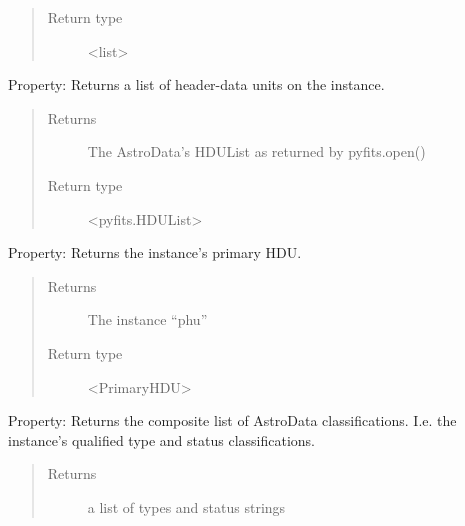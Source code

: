 \documentclass[letterpaper,10pt,english]{sphinxmanual}
\begin{document}
\begin{fulllineitems}
\begin{fulllineitems}
\begin{quote}
\begin{description}
\item[{Return type}] \leavevmode
\textless{}list\textgreater{}

\end{description}\end{quote}

\end{fulllineitems}


\begin{fulllineitems}
\label{astro_class:astrodata.AstroData.AstroData.hdulist}
Property: Returns a list of header-data units on the instance.
\begin{quote}\begin{description}
\item[{Returns}] \leavevmode
The AstroData's HDUList as returned by pyfits.open()

\item[{Return type}] \leavevmode
\textless{}pyfits.HDUList\textgreater{}

\end{description}\end{quote}

\end{fulllineitems}


\begin{fulllineitems}
\label{astro_class:astrodata.AstroData.AstroData.phu}
Property: Returns the instance's primary HDU.
\begin{quote}\begin{description}
\item[{Returns}] \leavevmode
The instance ``phu''

\item[{Return type}] \leavevmode
\textless{}PrimaryHDU\textgreater{}

\end{description}\end{quote}

\end{fulllineitems}


\begin{fulllineitems}
\label{astro_class:astrodata.AstroData.AstroData.types}
Property: Returns the composite list of AstroData classifications. I.e. 
the instance's qualified type and status classifications.
\begin{quote}\begin{description}
\item[{Returns}] \leavevmode
a list of types and status strings


\end{description}
\end{quote}
\end{fulllineitems}
\end{fulllineitems}
\end{document}
